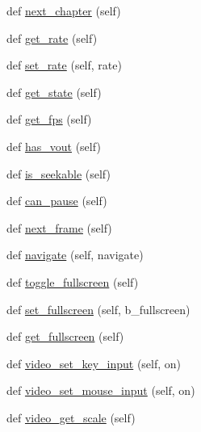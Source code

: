 \begin{DoxyCompactItemize}
\item 
def \hyperlink{classsrc_1_1lib_1_1vlc_1_1MediaPlayer_a4a85fc790507f37298912bfc325ba0b2}{next\+\_\+chapter} (self)
\item 
def \hyperlink{classsrc_1_1lib_1_1vlc_1_1MediaPlayer_a5c5ed3b44219e7328c0e57359bd84bfc}{get\+\_\+rate} (self)
\item 
def \hyperlink{classsrc_1_1lib_1_1vlc_1_1MediaPlayer_a20747e5bcf1868c13a408fb3eb457a3d}{set\+\_\+rate} (self, rate)
\item 
def \hyperlink{classsrc_1_1lib_1_1vlc_1_1MediaPlayer_a02a04a9e4326bf1529e491f53c4c764a}{get\+\_\+state} (self)
\item 
def \hyperlink{classsrc_1_1lib_1_1vlc_1_1MediaPlayer_aeb1d19e1210e0990b5a462fe2e7d879c}{get\+\_\+fps} (self)
\item 
def \hyperlink{classsrc_1_1lib_1_1vlc_1_1MediaPlayer_a17744a24372a771ef633021343871b6e}{has\+\_\+vout} (self)
\item 
def \hyperlink{classsrc_1_1lib_1_1vlc_1_1MediaPlayer_a8dbdf24ad5ef8942285eef73329b2550}{is\+\_\+seekable} (self)
\item 
def \hyperlink{classsrc_1_1lib_1_1vlc_1_1MediaPlayer_ae8d90592737c0365436ff1f56c6fdd76}{can\+\_\+pause} (self)
\item 
def \hyperlink{classsrc_1_1lib_1_1vlc_1_1MediaPlayer_a28493f51c0dfb736419d64e7d8adc78f}{next\+\_\+frame} (self)
\item 
def \hyperlink{classsrc_1_1lib_1_1vlc_1_1MediaPlayer_a83bb7bb439ab2e9421409a4aad373afe}{navigate} (self, navigate)
\item 
def \hyperlink{classsrc_1_1lib_1_1vlc_1_1MediaPlayer_a9106e5c886dc723e03e92a7b1d218793}{toggle\+\_\+fullscreen} (self)
\item 
def \hyperlink{classsrc_1_1lib_1_1vlc_1_1MediaPlayer_a1a282ddb55b91552adb942231e473477}{set\+\_\+fullscreen} (self, b\+\_\+fullscreen)
\item 
def \hyperlink{classsrc_1_1lib_1_1vlc_1_1MediaPlayer_aa063cbf521b4a2a0ebaf613c7d9667c4}{get\+\_\+fullscreen} (self)
\item 
def \hyperlink{classsrc_1_1lib_1_1vlc_1_1MediaPlayer_a3cf97e8bd6c7159141ae44ebabafe852}{video\+\_\+set\+\_\+key\+\_\+input} (self, on)
\item 
def \hyperlink{classsrc_1_1lib_1_1vlc_1_1MediaPlayer_a151269a84f9d47ff8567e8fb6ab7ce05}{video\+\_\+set\+\_\+mouse\+\_\+input} (self, on)
\item 
def \hyperlink{classsrc_1_1lib_1_1vlc_1_1MediaPlayer_a8a7e05dbdb99dba611c9a476446c2a06}{video\+\_\+get\+\_\+scale} (self)

\end{DoxyCompactItemize}
